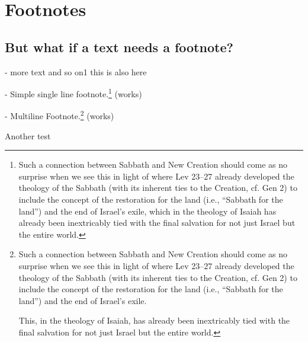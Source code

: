 \documentclass{article}
\begin{document}
	

\section{Footnotes}

\subsection{But what if a text needs a footnote?}

- more text and so on1
	this is also here



- Simple single line footnote.\footnote{
	Such a connection between Sabbath and New Creation should come as no surprise when we see this in light of where Lev 23--27 already developed the theology of the Sabbath (with its inherent ties to the Creation, cf. Gen 2) to include the concept of the restoration for the land (i.e., ``Sabbath for the land'') and the end of Israel's exile, which in the theology of Isaiah has already been inextricably tied with the final salvation for not just Israel but the entire world.} (works)
	
- Multiline Footnote.\footnote{
	Such a connection between Sabbath and New Creation should come as no surprise when we see this in light of where Lev 23--27 already developed the theology of the Sabbath (with its inherent ties to the Creation, cf. Gen 2) to include the concept of the restoration for the land (i.e., ``Sabbath for the land'') and the end of Israel's exile. 
	

	This, in the theology of Isaiah, has already been inextricably tied with the final salvation for not just Israel but the entire world.} (works)

	Another test
	
\end{document}
